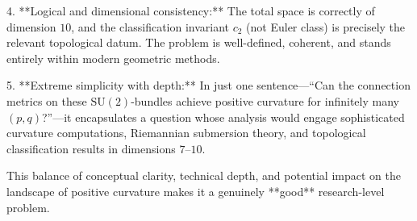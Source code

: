 4. **Logical and dimensional consistency:**  
   The total space is correctly of dimension \(10\), and the classification invariant \(c_2\) (not Euler class) is precisely the relevant topological datum. The problem is well-defined, coherent, and stands entirely within modern geometric methods.

5. **Extreme simplicity with depth:**  
   In just one sentence—“Can the connection metrics on these \(\mathrm{SU}(2)\)-bundles achieve positive curvature for infinitely many \((p,q)\)?”—it encapsulates a question whose analysis would engage sophisticated curvature computations, Riemannian submersion theory, and topological classification results in dimensions \(7\)–\(10\).

This balance of conceptual clarity, technical depth, and potential impact on the landscape of positive curvature makes it a genuinely **good** research-level problem.